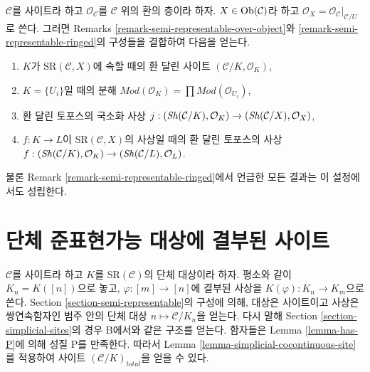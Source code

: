 \begin{remark}[대상 위에서의 환 달린 변형]
\label{remark-semi-representable-ringed-over-object}
$\mathcal{C}$를 사이트라 하고 $\mathcal{O}_\mathcal{C}$를
$\mathcal{C}$ 위의 환의 층이라 하자. $X \in \mathop{\mathrm{Ob}}\nolimits(\mathcal{C})$라 하고
$\mathcal{O}_X = \mathcal{O}_\mathcal{C}|_{\mathcal{C}/U}$로 쓴다.
그러면 Remarks \ref{remark-semi-representable-over-object}와
\ref{remark-semi-representable-ringed}의 구성들을 결합하여
다음을 얻는다.
\begin{enumerate}
\item $K$가 $\text{SR}(\mathcal{C}, X)$에 속할 때의 환 달린 사이트
$(\mathcal{C}/K, \mathcal{O}_K)$,
\item $K = \{U_i\}$일 때의 분해
$\textit{Mod}(\mathcal{O}_K) =
\prod \textit{Mod}(\mathcal{O}_{U_i})$,
\item 환 달린 토포스의 국소화 사상
$j : (\mathop{\mathit{Sh}}\nolimits(\mathcal{C}/K), \mathcal{O}_K) \to
(\mathop{\mathit{Sh}}\nolimits(\mathcal{C}/X), \mathcal{O}_X)$,
\item $f : K \to L$이 $\text{SR}(\mathcal{C}, X)$의 사상일 때의
환 달린 토포스의 사상
$f : (\mathop{\mathit{Sh}}\nolimits(\mathcal{C}/K), \mathcal{O}_K) \to
(\mathop{\mathit{Sh}}\nolimits(\mathcal{C}/L), \mathcal{O}_L)$.
\end{enumerate}
물론 Remark \ref{remark-semi-representable-ringed}에서 언급한 모든 결과는
이 설정에서도 성립한다.
\end{remark}


\section{단체 준표현가능 대상에 결부된 사이트}
\label{section-simplicial-semi-representable}

\noindent
$\mathcal{C}$를 사이트라 하고 $K$를 $\text{SR}(\mathcal{C})$의
단체 대상이라 하자. 평소와 같이 $K_n = K([n])$으로 놓고,
$\varphi : [m] \to [n]$에 결부된 사상을
$K(\varphi) : K_n \to K_m$으로 쓴다.
Section \ref{section-semi-representable}의 구성에 의해,
대상은 사이트이고 사상은 쌍연속함자인 범주 안의 단체 대상
$n \mapsto \mathcal{C}/K_n$을 얻는다. 다시 말해 Section
\ref{section-simplicial-sites}의 경우 B에서와 같은 구조를 얻는다.
함자들은 Lemma \ref{lemma-has-P}에 의해 성질 P를 만족한다.
따라서 Lemma \ref{lemma-simplicial-cocontinuous-site}를 적용하여
사이트 $(\mathcal{C}/K)_{total}$을 얻을 수 있다.


